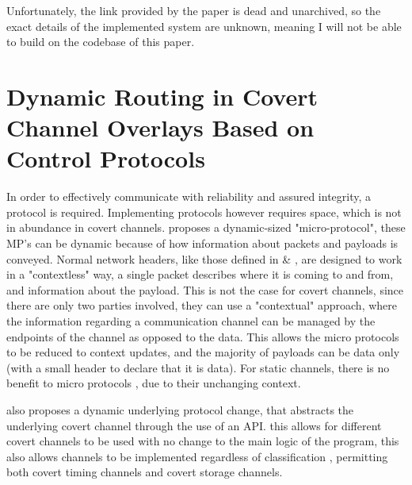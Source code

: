 Unfortunately, the link provided by the paper is dead and unarchived, so the exact details of the implemented system are unknown, meaning I will not be able to build on the codebase of this paper.

\section{Dynamic Routing in Covert Channel Overlays Based on Control Protocols}
\label{sec:DRiCCBoCP}

In order to effectively communicate with reliability and assured integrity, a protocol is required. Implementing protocols however requires space, which is not in abundance in covert channels. \cite{DRiCCBoCP} proposes a dynamic-sized "micro-protocol", these MP's can be dynamic because of how information about packets and payloads is conveyed. Normal network headers, like those defined in \cite{rfc791} \& \cite{Trfc793}, are designed to work in a "contextless" way, a single packet describes where it is coming to and from, and information about the payload. This is not the case for covert channels, since there are only two parties involved, they can use a "contextual" approach, where the information regarding a communication channel can be managed by the endpoints of the channel as opposed to the data. This allows the micro protocols to be reduced to context updates, and the majority of payloads can be data only (with a small header to declare that it is data). For static channels, there is no benefit to micro protocols \citep{DRiCCBoCP}, due to their unchanging context.

\cite{DRiCCBoCP} also proposes a dynamic underlying protocol change, that abstracts the underlying covert channel through the use of an API. this allows for different covert channels to be used with no change to the main logic of the program, this also allows channels to be implemented regardless of classification \citep{DRiCCBoCP}, permitting both covert timing channels and covert storage channels.

